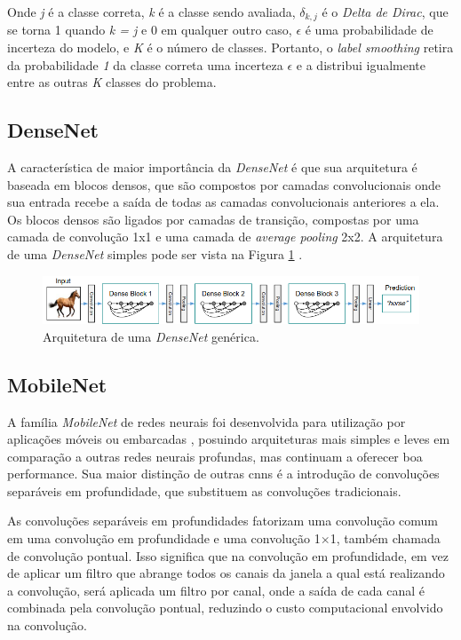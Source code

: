 Onde \textit{j} é a classe correta, \textit{k} é a classe sendo avaliada, $\delta_{k,j}$ é o \textit{Delta de Dirac}, que se torna 1 quando \textit{k = j} e 0 em qualquer outro caso, $\epsilon$ é uma probabilidade de incerteza do modelo, e \textit{K} é o número de classes. Portanto, o \textit{label smoothing} retira da probabilidade \textit{1} da classe correta uma incerteza $\epsilon$ e a distribui igualmente entre as outras \textit{K} classes do problema.
\subsection{DenseNet}

A característica de maior importância da \textit{DenseNet}\cite{densenet} é que sua arquitetura é baseada em blocos densos, 
que são compostos por camadas convolucionais onde sua entrada recebe a saída de todas as camadas convolucionais anteriores a ela. 
Os blocos densos são ligados por camadas de transição, compostas por uma camada de convolução 1x1 e uma camada de \textit{average pooling} 2x2. 
A arquitetura de uma \textit{DenseNet} simples pode ser vista na Figura \ref{fig:densenet_arch} \cite{densenet}.

\begin{figure}[htb]
\centerline{\includegraphics[width=1\linewidth]{images/densenet.png}}
\caption{Arquitetura de uma \textit{DenseNet} genérica\cite{densenet}.}
\label{fig:densenet_arch}
\end{figure}

\subsection{MobileNet}
A família \textit{MobileNet} de redes neurais foi desenvolvida para utilização por aplicações móveis ou embarcadas \cite{mobilenet}, 
posuindo arquiteturas mais simples e leves em comparação a outras redes neurais profundas, 
mas continuam a oferecer boa performance. Sua maior distinção de outras \acrshort{cnn}s é a introdução de convoluções separáveis em profundidade, que substituem as convoluções tradicionais.

As convoluções separáveis em profundidades fatorizam uma convolução comum em uma convolução em profundidade e uma convolução 1$\times$1, também chamada de convolução pontual. Isso significa que na convolução em profundidade, em vez de aplicar um filtro que abrange todos os canais da janela a qual está realizando a convolução, será aplicada um filtro por canal, onde a saída de cada canal é combinada pela convolução pontual, reduzindo o custo computacional envolvido na convolução.

